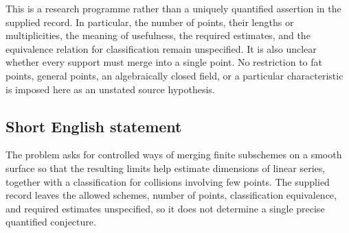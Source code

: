 \documentclass[11pt]{article}
\begin{document}
This is a research programme rather than a uniquely quantified assertion in the supplied record. In particular, the number of points, their lengths or multiplicities, the meaning of usefulness, the required estimates, and the equivalence relation for classification remain unspecified. It is also unclear whether every support must merge into a single point. No restriction to fat points, general points, an algebraically closed field, or a particular characteristic is imposed here as an unstated source hypothesis.
\subsection{Short English statement}
The problem asks for controlled ways of merging finite subschemes on a smooth surface so that the resulting limits help estimate dimensions of linear series, together with a classification for collisions involving few points. The supplied record leaves the allowed schemes, number of points, classification equivalence, and required estimates unspecified, so it does not determine a single precise quantified conjecture.
\end{document}
